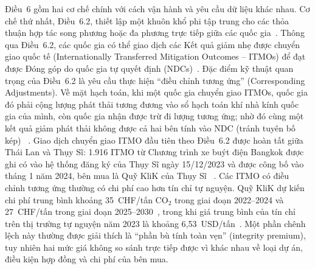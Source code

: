 Điều~6 gồm hai cơ chế chính với cách vận hành và yêu cầu dữ liệu khác nhau. Cơ chế thứ nhất, Điều~6.2, thiết lập một khuôn khổ phi tập trung cho các thỏa thuận hợp tác song phương hoặc đa phương trực tiếp giữa các quốc gia~\cite{columbia2025article6}. Thông qua Điều~6.2, các quốc gia có thể giao dịch các Kết quả giảm nhẹ được chuyển giao quốc tế (Internationally Transferred Mitigation Outcomes -- ITMOs) để đạt được Đóng góp do quốc gia tự quyết định (NDCs)~\cite{columbia2025article6}. Đặc điểm kỹ thuật quan trọng của Điều~6.2 là yêu cầu thực hiện ``điều chỉnh tương ứng'' (Corresponding Adjustments). Về mặt hạch toán, khi một quốc gia chuyển giao ITMOs, quốc gia đó phải cộng lượng phát thải tương đương vào sổ hạch toán khí nhà kính quốc gia của mình, còn quốc gia nhận được trừ đi lượng tương ứng; nhờ đó cùng một kết quả giảm phát thải không được cả hai bên tính vào NDC (tránh tuyên bố kép)~\cite{columbia2025article6} \cite{schneider2019double}. Giao dịch chuyển giao ITMO đầu tiên theo Điều~6.2 được hoàn tất giữa Thái Lan và Thụy Sĩ: 1.916 ITMO từ Chương trình xe buýt điện Bangkok được ghi có vào hệ thống đăng ký của Thụy Sĩ ngày 15/12/2023 và được công bố vào tháng 1 năm 2024, bên mua là Quỹ KliK của Thụy Sĩ~\cite{spglobal2024itmo} \cite{columbia2025article6}. Các ITMO có điều chỉnh tương ứng thường có chi phí cao hơn tín chỉ tự nguyện. Quỹ KliK dự kiến chi phí trung bình khoảng 35~CHF/tấn CO$_2$ trong giai đoạn 2022--2024 và 27~CHF/tấn trong giai đoạn 2025--2030~\cite{argus2024itmo}, trong khi giá trung bình của tín chỉ trên thị trường tự nguyện năm 2023 là khoảng 6,53~USD/tấn~\cite{foresttrends2024sovcm}. Một phần chênh lệch này thường được giải thích là ``phần bù tính toàn vẹn'' (integrity premium), tuy nhiên hai mức giá không so sánh trực tiếp được vì khác nhau về loại dự án, điều kiện hợp đồng và chi phí của bên mua.


